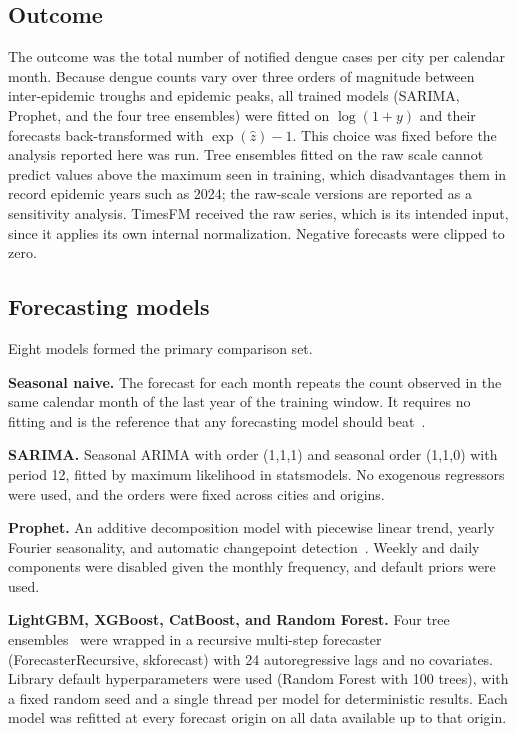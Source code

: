 \documentclass[10pt,letterpaper]{article}
\begin{document}
\subsection*{Outcome}
The outcome was the total number of notified dengue cases per city per calendar month. Because dengue counts vary over three orders of magnitude between inter-epidemic troughs and epidemic peaks, all trained models (SARIMA, Prophet, and the four tree ensembles) were fitted on $\log(1+y)$ and their forecasts back-transformed with $\exp(\hat{z})-1$. This choice was fixed before the analysis reported here was run. Tree ensembles fitted on the raw scale cannot predict values above the maximum seen in training, which disadvantages them in record epidemic years such as 2024; the raw-scale versions are reported as a sensitivity analysis. TimesFM received the raw series, which is its intended input, since it applies its own internal normalization. Negative forecasts were clipped to zero.

\subsection*{Forecasting models}
Eight models formed the primary comparison set.

\textbf{Seasonal naive.} The forecast for each month repeats the count observed in the same calendar month of the last year of the training window. It requires no fitting and is the reference that any forecasting model should beat~\cite{Hewamalage2023}.

\textbf{SARIMA.} Seasonal ARIMA with order (1,1,1) and seasonal order (1,1,0) with period 12, fitted by maximum likelihood in statsmodels. No exogenous regressors were used, and the orders were fixed across cities and origins.

\textbf{Prophet.} An additive decomposition model with piecewise linear trend, yearly Fourier seasonality, and automatic changepoint detection~\cite{Taylor2018prophet}. Weekly and daily components were disabled given the monthly frequency, and default priors were used.

\textbf{LightGBM, XGBoost, CatBoost, and Random Forest.} Four tree ensembles~\cite{Ke2017lightgbm,Chen2016xgboost,Prokhorenkova2018catboost,Breiman2001} were wrapped in a recursive multi-step forecaster (ForecasterRecursive, skforecast) with 24 autoregressive lags and no covariates. Library default hyperparameters were used (Random Forest with 100 trees), with a fixed random seed and a single thread per model for deterministic results. Each model was refitted at every forecast origin on all data available up to that origin.
\end{document}
